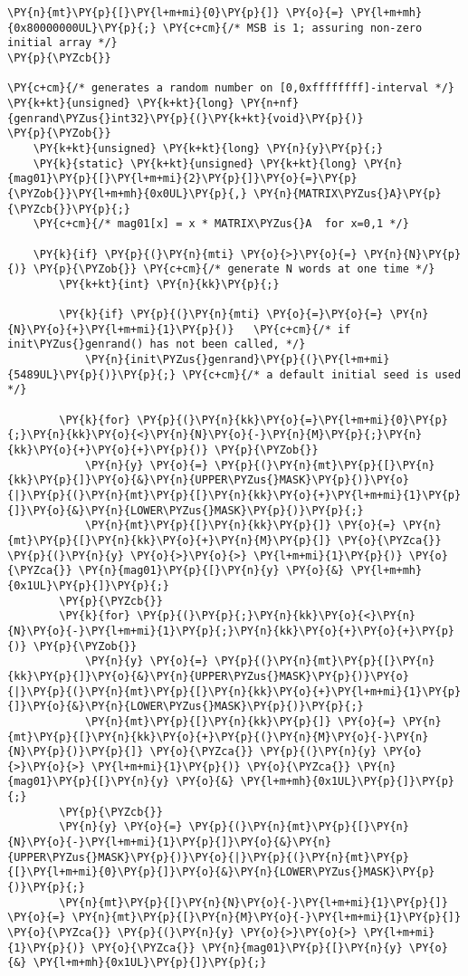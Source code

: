 \begin{Verbatim}[commandchars=\\\{\}]
	\PY{n}{mt}\PY{p}{[}\PY{l+m+mi}{0}\PY{p}{]} \PY{o}{=} \PY{l+m+mh}{0x80000000UL}\PY{p}{;} \PY{c+cm}{/* MSB is 1; assuring non-zero initial array */} 
\PY{p}{\PYZcb{}}

\PY{c+cm}{/* generates a random number on [0,0xffffffff]-interval */}
\PY{k+kt}{unsigned} \PY{k+kt}{long} \PY{n+nf}{genrand\PYZus{}int32}\PY{p}{(}\PY{k+kt}{void}\PY{p}{)}
\PY{p}{\PYZob{}}
	\PY{k+kt}{unsigned} \PY{k+kt}{long} \PY{n}{y}\PY{p}{;}
	\PY{k}{static} \PY{k+kt}{unsigned} \PY{k+kt}{long} \PY{n}{mag01}\PY{p}{[}\PY{l+m+mi}{2}\PY{p}{]}\PY{o}{=}\PY{p}{\PYZob{}}\PY{l+m+mh}{0x0UL}\PY{p}{,} \PY{n}{MATRIX\PYZus{}A}\PY{p}{\PYZcb{}}\PY{p}{;}
	\PY{c+cm}{/* mag01[x] = x * MATRIX\PYZus{}A  for x=0,1 */}

	\PY{k}{if} \PY{p}{(}\PY{n}{mti} \PY{o}{>}\PY{o}{=} \PY{n}{N}\PY{p}{)} \PY{p}{\PYZob{}} \PY{c+cm}{/* generate N words at one time */}
		\PY{k+kt}{int} \PY{n}{kk}\PY{p}{;}

		\PY{k}{if} \PY{p}{(}\PY{n}{mti} \PY{o}{=}\PY{o}{=} \PY{n}{N}\PY{o}{+}\PY{l+m+mi}{1}\PY{p}{)}   \PY{c+cm}{/* if init\PYZus{}genrand() has not been called, */}
			\PY{n}{init\PYZus{}genrand}\PY{p}{(}\PY{l+m+mi}{5489UL}\PY{p}{)}\PY{p}{;} \PY{c+cm}{/* a default initial seed is used */}

		\PY{k}{for} \PY{p}{(}\PY{n}{kk}\PY{o}{=}\PY{l+m+mi}{0}\PY{p}{;}\PY{n}{kk}\PY{o}{<}\PY{n}{N}\PY{o}{-}\PY{n}{M}\PY{p}{;}\PY{n}{kk}\PY{o}{+}\PY{o}{+}\PY{p}{)} \PY{p}{\PYZob{}}
			\PY{n}{y} \PY{o}{=} \PY{p}{(}\PY{n}{mt}\PY{p}{[}\PY{n}{kk}\PY{p}{]}\PY{o}{&}\PY{n}{UPPER\PYZus{}MASK}\PY{p}{)}\PY{o}{|}\PY{p}{(}\PY{n}{mt}\PY{p}{[}\PY{n}{kk}\PY{o}{+}\PY{l+m+mi}{1}\PY{p}{]}\PY{o}{&}\PY{n}{LOWER\PYZus{}MASK}\PY{p}{)}\PY{p}{;}
			\PY{n}{mt}\PY{p}{[}\PY{n}{kk}\PY{p}{]} \PY{o}{=} \PY{n}{mt}\PY{p}{[}\PY{n}{kk}\PY{o}{+}\PY{n}{M}\PY{p}{]} \PY{o}{\PYZca{}} \PY{p}{(}\PY{n}{y} \PY{o}{>}\PY{o}{>} \PY{l+m+mi}{1}\PY{p}{)} \PY{o}{\PYZca{}} \PY{n}{mag01}\PY{p}{[}\PY{n}{y} \PY{o}{&} \PY{l+m+mh}{0x1UL}\PY{p}{]}\PY{p}{;}
		\PY{p}{\PYZcb{}}
		\PY{k}{for} \PY{p}{(}\PY{p}{;}\PY{n}{kk}\PY{o}{<}\PY{n}{N}\PY{o}{-}\PY{l+m+mi}{1}\PY{p}{;}\PY{n}{kk}\PY{o}{+}\PY{o}{+}\PY{p}{)} \PY{p}{\PYZob{}}
			\PY{n}{y} \PY{o}{=} \PY{p}{(}\PY{n}{mt}\PY{p}{[}\PY{n}{kk}\PY{p}{]}\PY{o}{&}\PY{n}{UPPER\PYZus{}MASK}\PY{p}{)}\PY{o}{|}\PY{p}{(}\PY{n}{mt}\PY{p}{[}\PY{n}{kk}\PY{o}{+}\PY{l+m+mi}{1}\PY{p}{]}\PY{o}{&}\PY{n}{LOWER\PYZus{}MASK}\PY{p}{)}\PY{p}{;}
			\PY{n}{mt}\PY{p}{[}\PY{n}{kk}\PY{p}{]} \PY{o}{=} \PY{n}{mt}\PY{p}{[}\PY{n}{kk}\PY{o}{+}\PY{p}{(}\PY{n}{M}\PY{o}{-}\PY{n}{N}\PY{p}{)}\PY{p}{]} \PY{o}{\PYZca{}} \PY{p}{(}\PY{n}{y} \PY{o}{>}\PY{o}{>} \PY{l+m+mi}{1}\PY{p}{)} \PY{o}{\PYZca{}} \PY{n}{mag01}\PY{p}{[}\PY{n}{y} \PY{o}{&} \PY{l+m+mh}{0x1UL}\PY{p}{]}\PY{p}{;}
		\PY{p}{\PYZcb{}}
		\PY{n}{y} \PY{o}{=} \PY{p}{(}\PY{n}{mt}\PY{p}{[}\PY{n}{N}\PY{o}{-}\PY{l+m+mi}{1}\PY{p}{]}\PY{o}{&}\PY{n}{UPPER\PYZus{}MASK}\PY{p}{)}\PY{o}{|}\PY{p}{(}\PY{n}{mt}\PY{p}{[}\PY{l+m+mi}{0}\PY{p}{]}\PY{o}{&}\PY{n}{LOWER\PYZus{}MASK}\PY{p}{)}\PY{p}{;}
		\PY{n}{mt}\PY{p}{[}\PY{n}{N}\PY{o}{-}\PY{l+m+mi}{1}\PY{p}{]} \PY{o}{=} \PY{n}{mt}\PY{p}{[}\PY{n}{M}\PY{o}{-}\PY{l+m+mi}{1}\PY{p}{]} \PY{o}{\PYZca{}} \PY{p}{(}\PY{n}{y} \PY{o}{>}\PY{o}{>} \PY{l+m+mi}{1}\PY{p}{)} \PY{o}{\PYZca{}} \PY{n}{mag01}\PY{p}{[}\PY{n}{y} \PY{o}{&} \PY{l+m+mh}{0x1UL}\PY{p}{]}\PY{p}{;}


\end{Verbatim}
